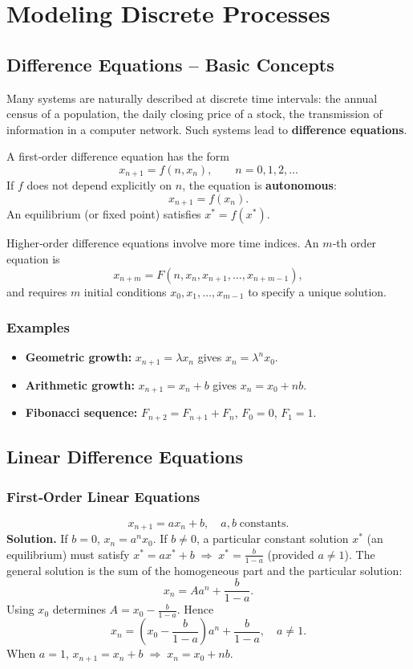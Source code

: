 \documentclass[12pt,a4paper]{book}
\begin{document}
\chapter{Modeling Discrete Processes}
\section{Difference Equations – Basic Concepts}
Many systems are naturally described at discrete time intervals: the annual census of a population, the daily closing price of a stock, the transmission of information in a computer network. Such systems lead to \textbf{difference equations}.

A first‑order difference equation has the form
\[
x_{n+1} = f(n, x_n), \qquad n = 0,1,2,\dots
\]
If $f$ does not depend explicitly on $n$, the equation is \textbf{autonomous}:
\[
x_{n+1} = f(x_n).
\]
An equilibrium (or fixed point) satisfies $x^* = f(x^*)$.

Higher‑order difference equations involve more time indices. An $m$‑th order equation is
\[
x_{n+m} = F(n, x_n, x_{n+1}, \dots, x_{n+m-1}),
\]
and requires $m$ initial conditions $x_0, x_1, \dots, x_{m-1}$ to specify a unique solution.

\subsection*{Examples}
\begin{itemize}
    \item \textbf{Geometric growth:} $x_{n+1} = \lambda x_n$ gives $x_n = \lambda^n x_0$.
    \item \textbf{Arithmetic growth:} $x_{n+1} = x_n + b$ gives $x_n = x_0 + n b$.
    \item \textbf{Fibonacci sequence:} $F_{n+2} = F_{n+1} + F_n$, $F_0=0$, $F_1=1$.
\end{itemize}

\section{Linear Difference Equations}

\subsection{First‑Order Linear Equations}
\[
x_{n+1} = a x_n + b, \quad a,b \;\text{constants}.
\]
\textbf{Solution.} If $b=0$, $x_n = a^n x_0$. If $b\neq0$, a particular constant solution $x^*$ (an equilibrium) must satisfy $x^* = a x^* + b \;\Rightarrow\; x^* = \frac{b}{1-a}$ (provided $a\neq1$). The general solution is the sum of the homogeneous part and the particular solution:
\[
x_n = A a^n + \frac{b}{1-a}.
\]
Using $x_0$ determines $A = x_0 - \frac{b}{1-a}$. Hence
\[
\boxed{x_n = \left(x_0 - \frac{b}{1-a}\right) a^n + \frac{b}{1-a}, \quad a\neq1.}
\]
When $a=1$, $x_{n+1} = x_n + b \;\Rightarrow\; x_n = x_0 + n b$.
\end{document}
